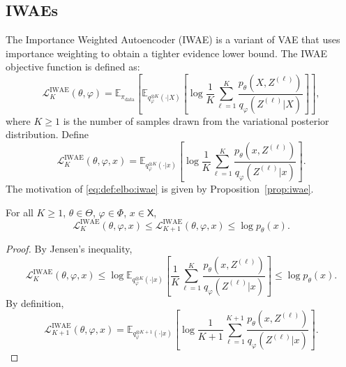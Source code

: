 \documentclass[english,graybox,envcountchap,envcountsame,sectrefs,shortlabels]{svmono}
\theoremstyle{style}
\newcommand{\eqsp}{}
\begin{document}
\subsection{IWAEs}
The Importance Weighted Autoencoder (IWAE) \cite{burda2015importance} is a variant of VAE that uses importance weighting to obtain a tighter evidence lower bound. The IWAE objective function is defined as:
\begin{equation}
\label{eq:def:elbo:iwae}
\mathcal{L}^{\text{IWAE}}_K(\theta, \varphi) = \mathbb{E}_{\pi_{\mathrm{data}}} \left[ \mathbb{E}_{q^{\otimes K}_{\varphi}(\cdot|X)} \left[ \log \frac{1}{K} \sum_{\ell=1}^{K} \frac{p_{\theta}(X, Z^{(\ell)})}{q_{\varphi}(Z^{(\ell)}|X)} \right] \right]\eqsp,
\end{equation}
where $K\geqslant 1$ is the number of samples drawn from the variational posterior distribution. Define
$$
\mathcal{L}^{\text{IWAE}}_K(\theta, \varphi,x) = \mathbb{E}_{q^{\otimes K}_{\varphi}(\cdot|x)} \left[ \log \frac{1}{K} \sum_{\ell=1}^{K} \frac{p_{\theta}(x, Z^{(\ell)})}{q_{\varphi}(Z^{(\ell)}|x)} \right]\eqsp.
$$
The motivation of \eqref{eq:def:elbo:iwae} is given by Proposition~\ref{prop:iwae}.
\begin{proposition}
\label{prop:iwae}
For all $K\geqslant 1$, $\theta \in\Theta$, $\varphi\in\Phi$, $x\in\mathsf{X}$,
$$
\mathcal{L}^{\text{IWAE}}_K(\theta, \varphi,x) \leqslant \mathcal{L}^{\text{IWAE}}_{K+1}(\theta, \varphi,x)\leqslant \log p_\theta(x)\eqsp.
$$
\end{proposition}
\begin{proof}
By Jensen's inequality,
$$
\mathcal{L}^{\text{IWAE}}_K(\theta, \varphi,x) \leqslant  \log \mathbb{E}_{q^{\otimes K}_{\varphi}(\cdot|x)} \left[ \frac{1}{K} \sum_{\ell=1}^{K} \frac{p_{\theta}(x, Z^{(\ell)})}{q_{\varphi}(Z^{(\ell)}|x)} \right] \leqslant \log p_\theta(x)\eqsp.
$$
By definition,
$$
\mathcal{L}^{\text{IWAE}}_{K+1}(\theta, \varphi,x) = \mathbb{E}_{q^{\otimes K+1}_{\varphi}(\cdot|x)} \left[ \log \frac{1}{K+1} \sum_{\ell=1}^{K+1} \frac{p_{\theta}(x, Z^{(\ell)})}{q_{\varphi}(Z^{(\ell)}|x)} \right]\eqsp.
$$
\end{proof}
\end{document}
